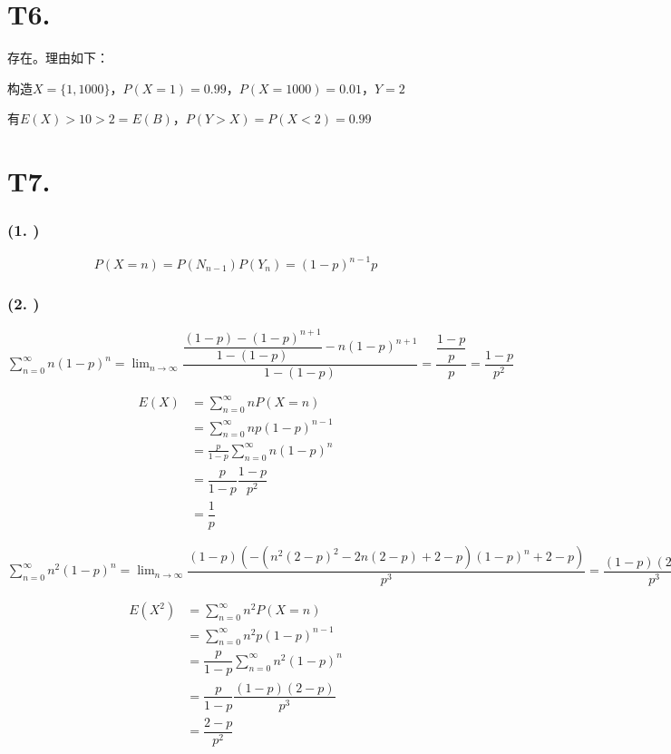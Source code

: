\documentclass{article}
\newcommand\f[2]{\frac{#1}{#2}}
\newcommand\df[2]{\dfrac{#1}{#2}}
\begin{document}
\section*{T6. }

存在。理由如下：

构造$X=\{1,1000\}$，$P(X=1)=0.99$，$P(X=1000)=0.01$，$Y=2$

有$E(X)>10>2=E(B)$，$P(Y>X)=P(X<2)=0.99$

\section*{T7. }

\subsubsection*{(1. )}

$$P(X=n)=P(N_{n-1})P(Y_n)=(1-p)^{n-1}p$$

\subsubsection*{(2. )}

$\sum_{n=0}^{\infty}n(1-p)^n=\lim_{n\to \infty}\df{\df{(1-p)-(1-p)^{n+1}}{1-(1-p)}-n(1-p)^{n+1}}{1-(1-p)}=\df{\df{1-p}{p}}{p}=\df{1-p}{p^2}$

\begin{equation}
    \begin{aligned}
        E(X)
        & =\sum_{n=0}^{\infty}nP(X=n)\\
        & =\sum_{n=0}^{\infty}np(1-p)^{n-1}\\
        & =\f{p}{1-p}\sum_{n=0}^{\infty}n(1-p)^n\\
        & =\df{p}{1-p}\df{1-p}{p^2}\\
        & =\df{1}{p}
    \end{aligned}
\end{equation}

$\sum_{n=0}^{\infty}n^2(1-p)^n=\lim_{n \to \infty}\df{(1-p)(-(n^2(2-p)^2-2n(2-p)+2-p)(1-p)^n+2-p)}{p^3}=\df{(1-p)(2-p)}{p^3}$

\begin{equation}
    \begin{aligned}
        E(X^2)
        & =\sum_{n=0}^{\infty}n^2P(X=n)\\
        & =\sum_{n=0}^{\infty}n^2p(1-p)^{n-1}\\
        & =\df{p}{1-p}\sum_{n=0}^{\infty}n^2(1-p)^n\\
        & =\df{p}{1-p}\df{(1-p)(2-p)}{p^3}\\
        & =\df{2-p}{p^2}
    \end{aligned}
\end{equation}
\end{document}
